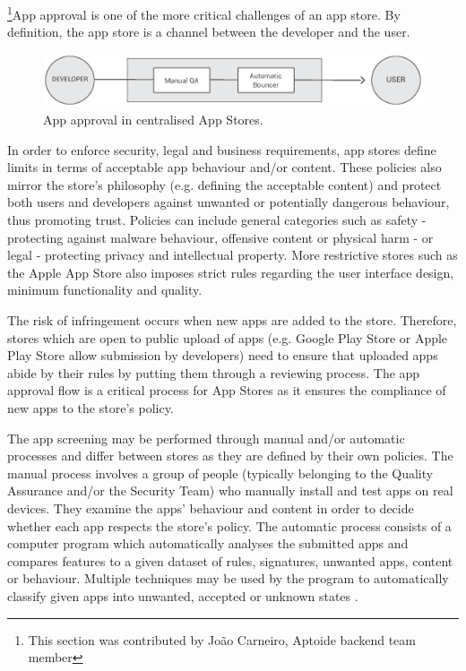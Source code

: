 \footnote{This section was contributed by Jo\~ao Carneiro, Aptoide backend team member}App approval is one of the more critical challenges of an app store. By definition, the app store is a channel between the developer and the user.

\begin{figure}[!ht]
\centering
\includegraphics[width=\textwidth]{diagrams/apps_approval_flow.eps}
\caption{App approval in centralised App Stores.}
\label{fig:app_approval_flow}
\end{figure}

In order to enforce security, legal and business requirements, app stores define limits in terms of acceptable app behaviour and/or content. These policies also mirror the store's philosophy (e.g. defining the acceptable content) and protect both users and developers against unwanted or potentially dangerous behaviour, thus promoting trust. Policies can include general categories such as safety - protecting against malware behaviour, offensive content or physical harm - or legal - protecting privacy and intellectual property. More restrictive stores such as the Apple App Store also imposes strict rules regarding the user interface design, minimum functionality and quality. \cite{GooglePolicyWebsite} \cite{ApplePolicyWebsite}


The risk of infringement occurs when new apps are added to the store. Therefore, stores which are open to public upload of apps (e.g. Google Play Store or Apple Play Store allow submission by developers) need to ensure that uploaded apps abide by their rules by putting them through a reviewing process. The app approval flow is a critical process for App Stores as it ensures the compliance of new apps to the store's policy.

The app screening may be performed through manual and/or automatic processes and differ between stores as they are defined by their own policies. The manual process involves a group of people (typically belonging to the Quality Assurance and/or the Security Team) who manually install and test apps on real devices. They examine the apps' behaviour and content in order to decide whether each app respects the store's policy. The automatic process consists of a computer program which automatically analyses the submitted apps and compares features to a given dataset of rules, signatures, unwanted apps, content or behaviour. Multiple techniques may be used by the program to automatically classify given apps into unwanted, accepted or unknown states \cite{Bhattacharya2017}.

